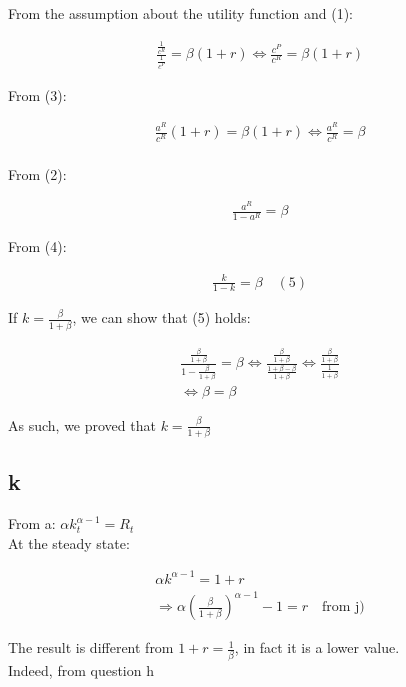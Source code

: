 \documentclass{article}
\begin{document}
From the assumption about the utility function and (1):

\begin{gather*}
    \frac{\frac{1}{c^R}}{\frac{1}{c^P}}=\beta (1+r)\Leftrightarrow\frac{c^P}{c^R}=\beta (1+r)
\end{gather*}

From (3):

\begin{gather*}
    \frac{a^R}{c^R}(1+r)=\beta (1+r)\Leftrightarrow \frac{a^R}{c^R}=\beta\\
\end{gather*}

From (2):

\begin{gather*}
    \frac{a^R}{1-a^R}=\beta
\end{gather*}

From (4):

\begin{gather*}
    \frac{k}{1-k}=\beta\quad(5)
\end{gather*}

If $k=\frac{\beta}{1+\beta}$, we can show that (5) holds:

\begin{gather*}
    \frac{\frac{\beta}{1+\beta}}{1-\frac{\beta}{1+\beta}}=\beta\Leftrightarrow \frac{\frac{\beta}{1+\beta}}{\frac{1+\beta-\beta}{1+\beta}}\Leftrightarrow\frac{\frac{\beta}{1+\beta}}{\frac{1}{1+\beta}}\\
    \Leftrightarrow \beta=\beta
\end{gather*}

As such, we proved that $k=\frac{\beta}{1+\beta}$

\subsection{k}

From a: $\alpha k_t^{\alpha-1}=R_t$\\

At the steady state:

\begin{gather*}
    \alpha k^{\alpha-1}=1+r\\
    \Rightarrow \alpha \left ( \frac{\beta}{1+\beta} \right ) ^{\alpha-1}-1=r\quad\mbox{from j)}
\end{gather*}

The result is different from $1+r = \frac{1}{\beta}$, in fact it is a lower value. \\
Indeed, from question h
\end{document}
